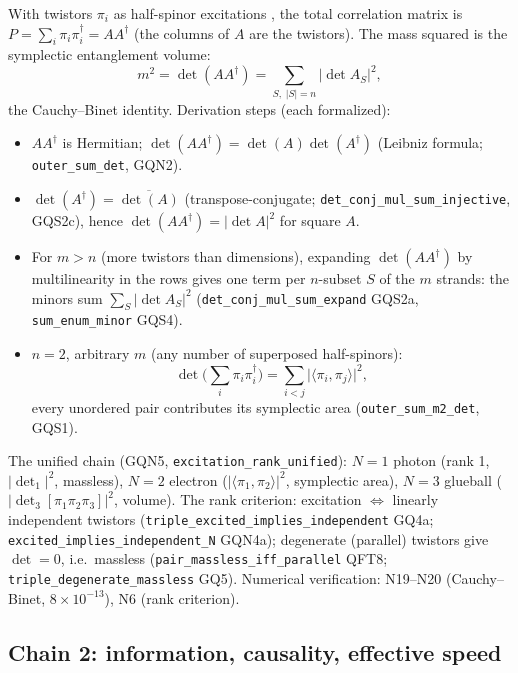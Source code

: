 \documentclass[aps,prd,preprint,superscriptaddress,amsmath,amssymb]{revtex4-2}
\begin{document}
With twistors $\pi_i$ as half-spinor excitations \cite{penrose1967twistor}, the
total correlation matrix is $P=\sum_i\pi_i\pi_i^\dagger=AA^\dagger$ (the
columns of $A$ are the twistors).  The mass squared is the symplectic
entanglement volume:
\begin{equation}
m^2=\det(AA^\dagger)=\sum_{S,\;|S|=n}\big|\det A_S\big|^2,
\label{eq:cb}
\end{equation}
the Cauchy--Binet identity.  Derivation steps (each formalized):
\begin{itemize}
\item $AA^\dagger$ is Hermitian; $\det(AA^\dagger)=\det(A)\det(A^\dagger)$
(Leibniz formula; \texttt{outer\_sum\_det}, GQN2).
\item $\det(A^\dagger)=\overline{\det(A)}$ (transpose-conjugate;
\texttt{det\_conj\_mul\_sum\_injective}, GQS2c), hence
$\det(AA^\dagger)=|\det A|^2$ for square $A$.
\item For $m>n$ (more twistors than dimensions), expanding
$\det(AA^\dagger)$ by multilinearity in the rows gives one term per
$n$-subset $S$ of the $m$ strands: the minors sum
$\sum_S|\det A_S|^2$ (\texttt{det\_conj\_mul\_sum\_expand} GQS2a,
\texttt{sum\_enum\_minor} GQS4).
\item $n=2$, arbitrary $m$ (any number of superposed half-spinors):
\begin{equation}
\det\Big(\sum_{i}\pi_i\pi_i^\dagger\Big)=\sum_{i<j}\big|\langle\pi_i,\pi_j\rangle\big|^2,
\label{eq:cb2}
\end{equation}
every unordered pair contributes its symplectic area
(\texttt{outer\_sum\_m2\_det}, GQS1).
\end{itemize}
The unified chain (GQN5, \texttt{excitation\_rank\_unified}):
$N=1$ photon (rank 1, $|\det_1|^2$, massless), $N=2$ electron
($|\langle\pi_1,\pi_2\rangle|^2$, symplectic area), $N=3$ glueball
($|\det_3[\pi_1\pi_2\pi_3]|^2$, volume).  The rank criterion:
excitation $\Leftrightarrow$ linearly independent twistors
(\texttt{triple\_excited\_\allowbreak implies\_independent} GQ4a;
\texttt{excited\_implies\_\allowbreak independent\_N} GQN4a); degenerate (parallel)
twistors give $\det=0$, i.e.\ massless
(\texttt{pair\_massless\_iff\_parallel} QFT8;
\texttt{triple\_degenerate\_massless} GQ5).  Numerical verification:
N19--N20 (Cauchy--Binet, $8\times10^{-13}$), N6 (rank criterion).

\subsection{Chain 2: information, causality, effective speed}
\label{app:chain2}
\end{document}
